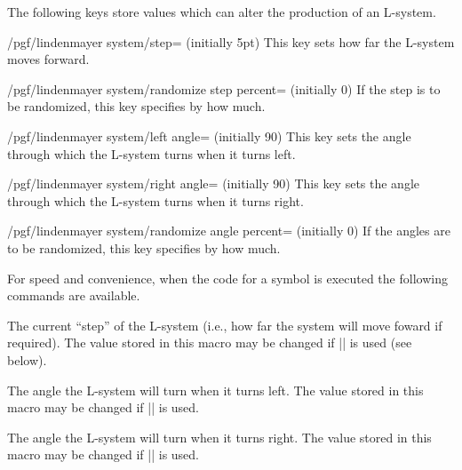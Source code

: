 \begin{command}{\pgfdeclarelindenmayersystem{}}
\begin{command}{\symbol{}}
The following keys store values which can alter the production of an
L-system. 

\begin{key}{/pgf/lindenmayer system/step= (initially 5pt)}
  This key sets how far the L-system moves forward.
\end{key}

\begin{key}{/pgf/lindenmayer system/randomize step percent= (initially 0)}
  If the step is to be randomized, this key specifies by how much. 
\end{key}

\begin{key}{/pgf/lindenmayer system/left angle= (initially 90)}
  This key sets the angle through which the L-system turns when it
  turns left.
\end{key}

\begin{key}{/pgf/lindenmayer system/right angle= (initially 90)}
  This key sets the angle through which the L-system turns when it
  turns right.
\end{key}

\begin{key}{/pgf/lindenmayer system/randomize angle percent= (initially 0)}
  If the angles are to be randomized, this key specifies by how much. 
\end{key}

For speed and convenience, when the code for a symbol is executed the 
following commands are available.

\begin{command}{\pgflsystemstep}
	The current ``step'' of the L-system (i.e., how far the system
	will move foward if required). The value stored in this macro
	may be changed if |\pgflsystemrandomizestep| is used (see below). 
\end{command}

\begin{command}{\pgflsystemleftangle}
	The angle the L-system will turn when it turns left. 
	The value stored in this macro may be changed if 
	|\pgflsystemrandomizeleftangle| is used. 
\end{command}

\begin{command}{\pgflsystemrightangle}
	The angle the L-system will turn when it turns right. 
	The value stored in this macro may be changed if 
	|\pgflsystemrandomizerightangle| is used. 
\end{command}



\end{command}
\end{command}

